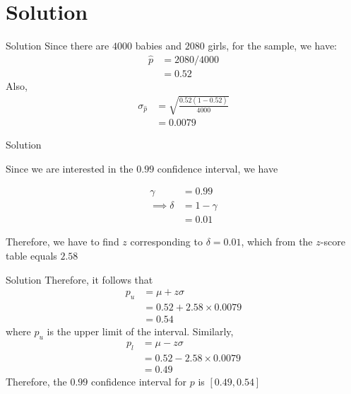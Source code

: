 \documentclass{beamer}
\begin{document}
\section{Solution}
\begin{frame}{Solution}
Since there are $4000$ babies and $2080$ girls, for the sample, we have:
\begin{align}
    \hat{p} &= 2080/4000 \\
            &= 0.52
 \end{align}
 Also,
     \begin{align}
    \sigma_{\hat{p}} &= \sqrt{\frac{0.52(1-0.52)}{4000}} \\
    &= 0.0079
 \end{align}


\end{frame}

\begin{frame}{Solution}
    
    Since we are interested in the $0.99$ confidence interval, we have
    
     \begin{align}
     \gamma &= 0.99 \\ 
     \implies \delta &= 1 - \gamma \\
     &= 0.01 
 \end{align}
 
 Therefore, we have to find $z$ corresponding to $\delta = 0.01$, which from the $z$-score table equals $2.58$
    
\end{frame}


\begin{frame}{Solution}
    Therefore, it follows that
    \begin{align}
        p_u &= \mu + z\sigma \\
        &= 0.52 + 2.58 \times 0.0079 \\
        &= 0.54
    \end{align}
    where $p_u$ is the upper limit of the interval. Similarly, 
    \begin{align}
        p_l &= \mu - z\sigma \\
        &= 0.52 - 2.58 \times 0.0079 \\
        &= 0.49
    \end{align}
    Therefore, the $0.99$ confidence interval for $p$ is $[0.49,0.54]$
\end{frame}
\end{document}
